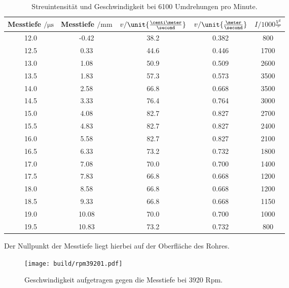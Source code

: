 \begin{table}
     \centering
     \caption{Streuintensität und Geschwindigkeit bei 6100 Umdrehungen pro Minute.}
     \begin{tabular}{c c c c c}
          \toprule
          Messtiefe $ \mathrm{/} \unit{\micro \second}$ &  Messtiefe $ \mathrm{/} \unit{\milli \meter}$ & $v \mathrm{/} \unit{\frac{\centi \meter}{\second}}$ & $v \mathrm{/} \unit{\frac{\meter}{\second}}$ & $I \mathrm{/} 1000\unit{\frac{V^2}{\second}}$\\
          \midrule
          12.0 &  -0.42 &  38.2 &  0.382 &  800\\
          12.5 &  0.33 &  44.6 &  0.446 &  1700\\
          13.0 &  1.08 &  50.9 &  0.509 &  2600\\
          13.5 &  1.83 &  57.3 &  0.573 &  3500\\
          14.0 &  2.58 &  66.8 &  0.668 &  3500\\
          14.5 &  3.33 &  76.4 &  0.764 &  3000\\
          15.0 &  4.08 &  82.7 &  0.827 &  2700\\
          15.5 &  4.83 &  82.7 &  0.827 &  2400\\
          16.0 &  5.58 &  82.7 &  0.827 &  2100\\
          16.5 &  6.33 &  73.2 &  0.732 &  1800\\
          17.0 &  7.08 &  70.0 &  0.700 &  1400\\
          17.5 &  7.83 &  66.8 &  0.668 &  1200\\
          18.0 &  8.58 &  66.8 &  0.668 &  1200\\
          18.5 &  9.33 &  66.8 &  0.668 &  1150\\
          19.0 &  10.08 &  70.0 &  0.700 &  1000\\
          19.5 &  10.83 &  73.2 &  0.732 &  800\\
          \bottomrule
     \end{tabular}
     \label{tab:6100rpm}
\end{table}

Der Nullpunkt der Messtiefe liegt hierbei auf der Oberfläche des Rohres.


\begin{figure}
     \centering
     \texttt{[image: build/rpm39201.pdf]}
     \caption{Geschwindigkeit aufgetragen gegen die Messtiefe bei 3920 Rpm.}
     \label{fig:39201}
\end{figure}

